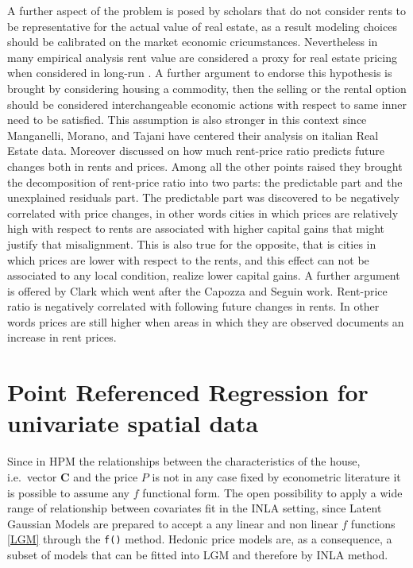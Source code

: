 \documentclass[
  12pt,
  a4paper,
  oneside]{book}
\newcommand{\passthrough}[1]{#1}
\theoremstyle{definition}
\theoremstyle{definition}
\theoremstyle{definition}
\theoremstyle{remark}
\begin{document}
A further aspect of the problem is posed by scholars that do not consider rents to be representative for the actual value of real estate, as a result modeling choices should be calibrated on the market economic cricumstances. Nevertheless in many empirical analysis rent value are considered a proxy for real estate pricing when considered in long-run \citep{Herath_Maier_2011}. A further argument to endorse this hypothesis is brought by \citet{sellingVSrental} considering housing a commodity, then the selling or the rental option should be considered interchangeable economic actions with respect to same inner need to be satisfied. This assumption is also stronger in this context since Manganelli, Morano, and Tajani have centered their analysis on italian Real Estate data. Moreover \citet{Capozza_Seguin_1996} discussed on how much rent-price ratio predicts future changes both in rents and prices. Among all the other points raised they brought the decomposition of rent-price ratio into two parts: the predictable part and the unexplained residuals part. The predictable part was discovered to be negatively correlated with price changes, in other words cities in which prices are relatively high with respect to rents are associated with higher capital gains that might justify that misalignment. This is also true for the opposite, that is cities in which prices are lower with respect to the rents, and this effect can not be associated to any local condition, realize lower capital gains. A further argument is offered by Clark \citep{Clark_1995} which went after the Capozza and Seguin work. Rent-price ratio is negatively correlated with following future changes in rents. In other words prices are still higher when areas in which they are observed documents an increase in rent prices.

\hypertarget{univariateregr}{%
\section{Point Referenced Regression for univariate spatial data}\label{univariateregr}}

Since in HPM the relationships between the characteristics of the house, i.e.~vector \(\mathbf{C}\) and the price \(P\) is not in any case fixed by econometric literature it is possible to assume any \(f\) functional form. The open possibility to apply a wide range of relationship between covariates fit in the INLA setting, since Latent Gaussian Models are prepared to accept a any linear and non linear \(f\) functions \ref{LGM} through the \passthrough{\lstinline!f()!} method. Hedonic price models are, as a consequence, a subset of models that can be fitted into LGM and therefore by INLA method.
\end{document}
